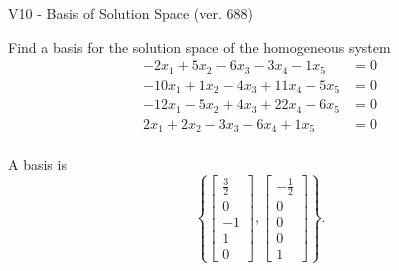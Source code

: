 \begin{exercise}
  \begin{exerciseTitle}V10 - Basis of Solution Space (ver. 688)\end{exerciseTitle}
  \begin{exerciseStatement}
    Find a basis for the solution space of the homogeneous system 
\begin{align*}
 -2 x_ 1 + 5 x_ 2 -6 x_ 3 -3 x_ 4 -1 x_ 5 &= 0  \\ 
  -10 x_ 1 + 1 x_ 2 -4 x_ 3 + 11 x_ 4 -5 x_ 5 &= 0  \\ 
  -12 x_ 1 -5 x_ 2 + 4 x_ 3 + 22 x_ 4 -6 x_ 5 &= 0  \\ 
  2 x_ 1 + 2 x_ 2 -3 x_ 3 -6 x_ 4 + 1 x_ 5 &= 0  \\ 
 \end{align*}


 
  \end{exerciseStatement}

  \begin{exerciseAnswer}
   A basis is   
\[\left\{\left[\begin{array}{c}
\frac{3}{2} \\
0 \\
-1 \\
1 \\
0
\end{array}\right] , \left[\begin{array}{c}
-\frac{1}{2} \\
0 \\
0 \\
0 \\
1
\end{array}\right]\right\}.\]

  


  \end{exerciseAnswer}
\end{exercise}